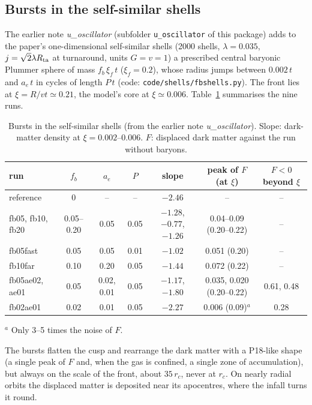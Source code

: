 \documentclass[11pt,a4paper]{article}
\theoremstyle{definition}
\theoremstyle{remark}
\newcommand{\rc}{r_c}
\begin{document}
\subsection{Bursts in the self-similar shells}\label{sec:shells}

The earlier note \emph{u\_oscillator} (subfolder \texttt{u\_oscillator} of this package) adds to the paper's one-dimensional self-similar shells
(2000 shells, $\lambda=0.035$, $j=\sqrt2\lambda R_{\rm ta}$ at turnaround, units $G=v=1$) a
prescribed central baryonic Plummer sphere of mass $f_b\,\xi_f\,t$ ($\xi_f=0.2$), whose radius
jumps between $0.002\,t$ and $a_e\,t$ in cycles of length $P\,t$ (code:
\texttt{code/shells/fbshells.py}). The front lies at $\xi=R/vt\simeq0.21$, the model's core at
$\xi\simeq0.006$. Table~\ref{tab:shells} summarises the nine runs.

\begin{table}[h]
\centering\footnotesize
\setlength\tabcolsep{4pt}
\caption{Bursts in the self-similar shells (from the earlier note \emph{u\_oscillator}). Slope: dark-matter
density at $\xi=0.002$--0.006. $F$: displaced dark matter against the run without baryons.}
\label{tab:shells}
\begin{tabular}{lcccccc}
\toprule
run & $f_b$ & $a_e$ & $P$ & slope & peak of $F$ (at $\xi$) & $F<0$ beyond $\xi$\\
\midrule
reference & 0 & -- & -- & $-2.46$ & -- & --\\
fb05, fb10, fb20 & 0.05--0.20 & 0.05 & 0.05 & $-1.28$, $-0.77$, $-1.26$ & 0.04--0.09 (0.20--0.22) & --\\
fb05fast & 0.05 & 0.05 & 0.01 & $-1.02$ & 0.051 (0.20) & --\\
fb10far & 0.10 & 0.20 & 0.05 & $-1.44$ & 0.072 (0.22) & --\\
fb05ae02, ae01 & 0.05 & 0.02, 0.01 & 0.05 & $-1.17$, $-1.80$ & 0.035, 0.020 (0.20--0.22) & 0.61, 0.48\\
fb02ae01 & 0.02 & 0.01 & 0.05 & $-2.27$ & 0.006 (0.09)$^a$ & 0.28\\
\bottomrule
\end{tabular}

\smallskip
$^a$ Only 3--5 times the noise of $F$.
\end{table}

The bursts flatten the cusp and rearrange the dark matter with a P18-like shape (a single peak
of $F$ and, when the gas is confined, a single zone of accumulation), but always on the scale of
the front, about $35\,\rc$, never at $\rc$. On nearly radial orbits the displaced matter is
deposited near its apocentres, where the infall turns it round.
\end{document}
